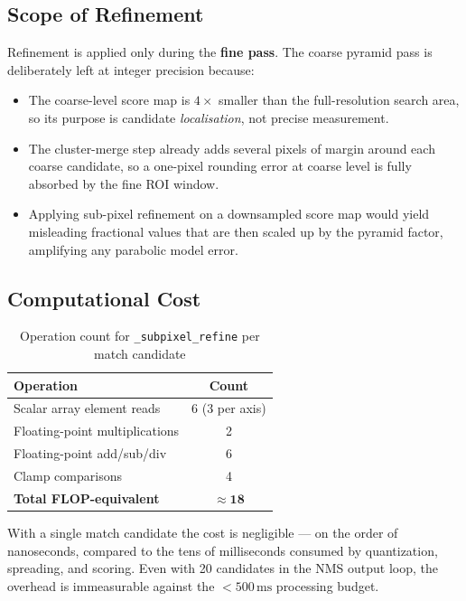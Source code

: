 \documentclass[12pt,a4paper]{article}
\begin{document}
\subsection{Scope of Refinement}

Refinement is applied only during the \textbf{fine pass}.
The coarse pyramid pass is deliberately left at integer precision because:
\begin{itemize}
  \item The coarse-level score map is $4\times$ smaller than the
        full-resolution search area, so its purpose is candidate
        \emph{localisation}, not precise measurement.
  \item The cluster-merge step already adds several pixels of margin
        around each coarse candidate, so a one-pixel rounding error at
        coarse level is fully absorbed by the fine ROI window.
  \item Applying sub-pixel refinement on a downsampled score map would
        yield misleading fractional values that are then scaled up by
        the pyramid factor, amplifying any parabolic model error.
\end{itemize}

\subsection{Computational Cost}

\begin{table}[H]
  \centering
  \caption{Operation count for \texttt{\_subpixel\_refine} per match candidate}
  \label{tab:subpixel_cost}
  \begin{tabular}{lc}
    \toprule
    \textbf{Operation}              & \textbf{Count} \\
    \midrule
    Scalar array element reads      & 6 (3 per axis) \\
    Floating-point multiplications  & 2              \\
    Floating-point add/sub/div      & 6              \\
    Clamp comparisons               & 4              \\
    \midrule
    \textbf{Total FLOP-equivalent}  & $\mathbf{\approx 18}$ \\
    \bottomrule
  \end{tabular}
\end{table}

With a single match candidate the cost is negligible --- on the order
of nanoseconds, compared to the tens of milliseconds consumed by
quantization, spreading, and scoring.  Even with 20 candidates in the
NMS output loop, the overhead is immeasurable against the $<500\,\text{ms}$
processing budget.
\end{document}
